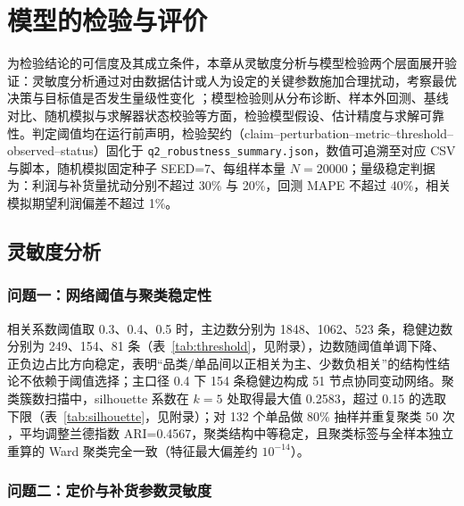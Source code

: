 \section{模型的检验与评价}

为检验结论的可信度及其成立条件，本章从灵敏度分析与模型检验两个层面展开验证：灵敏度分析通过对由数据估计或人为设定的关键参数施加合理扰动，考察最优决策与目标值是否发生量级性变化 \cite{saltelli2008}；模型检验则从分布诊断、样本外回测、基线对比、随机模拟与求解器状态校验等方面，检验模型假设、估计精度与求解可靠性。判定阈值均在运行前声明，检验契约（claim--perturbation--metric--threshold--observed--status）固化于 \texttt{q2\_robustness\_summary.json}，数值可追溯至对应 CSV 与脚本，随机模拟固定种子 SEED=7、每组样本量 $N=20000$；量级稳定判据为：利润与补货量扰动分别不超过 30\% 与 20\%，回测 MAPE 不超过 40\%，相关模拟期望利润偏差不超过 1\%。

\subsection{灵敏度分析}
\label{sensitivity_analysis}

\subsubsection{问题一：网络阈值与聚类稳定性}

相关系数阈值取 0.3、0.4、0.5 时，主边数分别为 1848、1062、523 条，稳健边数分别为 249、154、81 条（表~\ref{tab:threshold}，见附录），边数随阈值单调下降、正负边占比方向稳定，表明“品类/单品间以正相关为主、少数负相关”的结构性结论不依赖于阈值选择；主口径 0.4 下 154 条稳健边构成 51 节点协同变动网络。聚类簇数扫描中，silhouette 系数在 $k=5$ 处取得最大值 0.2583，超过 0.15 的选取下限（表~\ref{tab:silhouette}，见附录）；对 132 个单品做 80\% 抽样并重复聚类 50 次 \cite{efron1993}，平均调整兰德指数 ARI=0.4567，聚类结构中等稳定，且聚类标签与全样本独立重算的 Ward 聚类完全一致（特征最大偏差约 $10^{-14}$）。

\subsubsection{问题二：定价与补货参数灵敏度}

